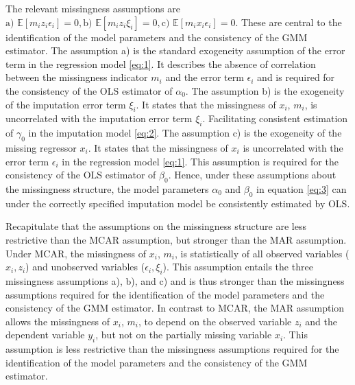 The relevant missingness assumptions are $\text{a) }\mathbb{E}[m_i z_i \epsilon_i] = 0, \text{b) }\mathbb{E}[m_i z_i \xi_i] = 0, \text{c) }\mathbb{E}[m_i x_i \epsilon_i] = 0$.
These are central to the identification of the model parameters and the consistency of the GMM estimator.
The assumption a) is the standard exogeneity assumption of the error term in the regression model \eqref{eq:1}.
It describes the absence of correlation between the missingness indicator $m_i$ and the error term $\epsilon_i$ and is required for the consistency of the OLS estimator of $\alpha_0$.
The assumption b) is the exogeneity of the imputation error term $\xi_i$.
It states that the missingness of $x_i$, $m_i$, is uncorrelated with the imputation error term $\xi_i$.
Facilitating consistent estimation of $\gamma_0$ in the imputation model \eqref{eq:2}.
The assumption c) is the exogeneity of the missing regressor $x_i$.
It states that the missingness of $x_i$ is uncorrelated with the error term $\epsilon_i$ in the regression model \eqref{eq:1}.
This assumption is required for the consistency of the OLS estimator of $\beta_0$.
Hence, under these assumptions about the missingness structure, the model parameters $\alpha_0$ and $\beta_0$ in equation \eqref{eq:3} can under the correctly specified imputation model be consistently estimated by OLS.

Recapitulate that the assumptions on the missingness structure are less restrictive than the MCAR assumption, but stronger than the MAR assumption.
Under MCAR, the missingness of $x_i$, $m_i$, is statistically of all observed variables ($x_i, z_i$) and unobserved variables ($\epsilon_i, \xi_i$).
This assumption entails the three missingness assumptions a), b), and c) and is thus stronger than the missingness assumptions required for the identification of the model parameters and the consistency of the GMM estimator.
In contrast to MCAR, the MAR assumption allows the missingness of $x_i$, $m_i$, to depend on the observed variable $z_i$ and the dependent variable $y_i$, but not on the partially missing variable $x_i$.
This assumption is less restrictive than the missingness assumptions required for the identification of the model parameters and the consistency of the GMM estimator.

